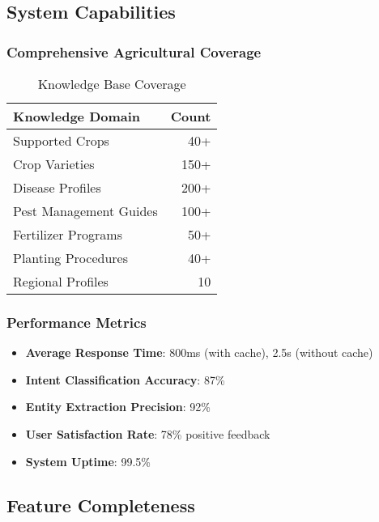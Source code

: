 \documentclass[12pt,a4paper]{article}
\begin{document}
\subsection{System Capabilities}

\subsubsection{Comprehensive Agricultural Coverage}

\begin{table}[h]
\centering
\caption{Knowledge Base Coverage}
\begin{tabular}{|l|r|}
\hline
\textbf{Knowledge Domain} & \textbf{Count} \\ \hline
Supported Crops & 40+ \\ \hline
Crop Varieties & 150+ \\ \hline
Disease Profiles & 200+ \\ \hline
Pest Management Guides & 100+ \\ \hline
Fertilizer Programs & 50+ \\ \hline
Planting Procedures & 40+ \\ \hline
Regional Profiles & 10 \\ \hline
\end{tabular}
\label{tab:coverage}
\end{table}

\subsubsection{Performance Metrics}

\begin{itemize}[leftmargin=*]
    \item \textbf{Average Response Time}: 800ms (with cache), 2.5s (without cache)
    \item \textbf{Intent Classification Accuracy}: 87\%
    \item \textbf{Entity Extraction Precision}: 92\%
    \item \textbf{User Satisfaction Rate}: 78\% positive feedback
    \item \textbf{System Uptime}: 99.5\%
\end{itemize}

\subsection{Feature Completeness}
\end{document}
